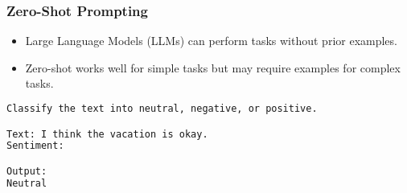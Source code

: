 
\begin{frame}[fragile]\frametitle{Zero-Shot Prompting}
    \begin{itemize}
        \item Large Language Models (LLMs) can perform tasks without prior examples.
        \item Zero-shot works well for simple tasks but may require examples for complex tasks.
    \end{itemize}
	
\begin{lstlisting}[language=HTML]
Classify the text into neutral, negative, or positive. 

Text: I think the vacation is okay.
Sentiment:

Output:
Neutral
\end{lstlisting}
\end{frame}






